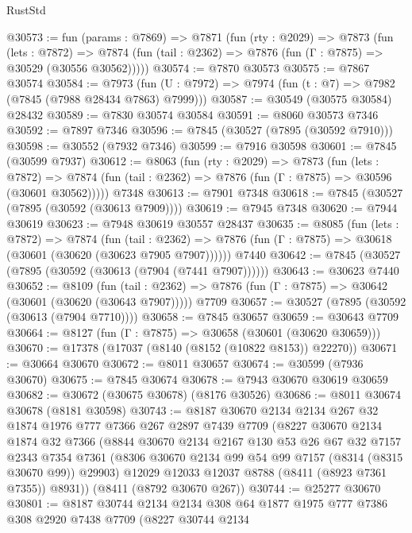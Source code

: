 \begin{lexlean}{RustStd}
\begin{coremodule}
@30573 := fun (params : @7869) =>
  @7871
    (fun (rty : @2029) =>
    @7873
      (fun (lets : @7872) =>
      @7874 (fun (tail : @2362) => @7876 (fun (Γ : @7875) => @30529 (@30556 @30562)))))
@30574 := @7870 @30573
@30575 := @7867 @30574
@30584 := @7973
    (fun (U : @7972) => @7974 (fun (t : @7) => @7982 (@7845 (@7988 @28434 @7863) @7999)))
@30587 := @30549 (@30575 @30584) @28432
@30589 := @7830 @30574 @30584
@30591 := @8060 @30573 @7346
@30592 := @7897 @7346
@30596 := @7845 (@30527 (@7895 (@30592 @7910)))
@30598 := @30552 (@7932 @7346)
@30599 := @7916 @30598
@30601 := @7845 (@30599 @7937)
@30612 := @8063
    (fun (rty : @2029) =>
    @7873
      (fun (lets : @7872) =>
      @7874 (fun (tail : @2362) => @7876 (fun (Γ : @7875) => @30596 (@30601 @30562)))))
    @7348
@30613 := @7901 @7348
@30618 := @7845 (@30527 (@7895 (@30592 (@30613 @7909))))
@30619 := @7945 @7348
@30620 := @7944 @30619
@30623 := @7948 @30619 @30557 @28437
@30635 := @8085
    (fun (lets : @7872) =>
    @7874
      (fun (tail : @2362) =>
      @7876 (fun (Γ : @7875) => @30618 (@30601 (@30620 (@30623 @7905 @7907))))))
    @7440
@30642 := @7845 (@30527 (@7895 (@30592 (@30613 (@7904 (@7441 @7907))))))
@30643 := @30623 @7440
@30652 := @8109
    (fun (tail : @2362) => @7876 (fun (Γ : @7875) => @30642 (@30601 (@30620 (@30643 @7907)))))
    @7709
@30657 := @30527 (@7895 (@30592 (@30613 (@7904 @7710))))
@30658 := @7845 @30657
@30659 := @30643 @7709
@30664 := @8127 (fun (Γ : @7875) => @30658 (@30601 (@30620 @30659)))
@30670 := @17378 (@17037 (@8140 (@8152 (@10822 @8153)) @22270))
@30671 := @30664 @30670
@30672 := @8011 @30657
@30674 := @30599 (@7936 @30670)
@30675 := @7845 @30674
@30678 := @7943 @30670 @30619 @30659
@30682 := @30672 (@30675 @30678) (@8176 @30526)
@30686 := @8011 @30674 @30678 (@8181 @30598)
@30743 := @8187
    @30670
    @2134
    @2134
    @267
    @32
    @1874
    @1976
    @777
    @7366
    @267
    @2897
    @7439
    @7709
    (@8227
      @30670
      @2134
      @1874
      @32
      @7366
      (@8844
        @30670
        @2134
        @2167
        @130
        @53
        @26
        @67
        @32
        @7157
        @2343
        @7354
        @7361
        (@8306 @30670 @2134 @99 @54 @99 @7157 (@8314 (@8315 @30670 @99)) @29903)
        @12029
        @12033
        @12037
        @8788
        (@8411 (@8923 @7361 @7355))
        @8931))
    (@8411 (@8792 @30670 @267))
@30744 := @25277 @30670
@30801 := @8187
    @30744
    @2134
    @2134
    @308
    @64
    @1877
    @1975
    @777
    @7386
    @308
    @2920
    @7438
    @7709
    (@8227
      @30744
      @2134

\end{coremodule}
\end{lexlean}
